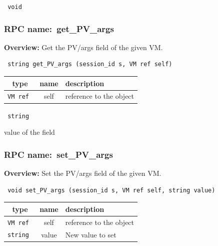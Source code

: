 \vspace{0.3cm}

{\tt 
void
}



\vspace{0.3cm}
\vspace{0.3cm}
\vspace{0.3cm}
\subsubsection{RPC name:~get\_PV\_args}

{\bf Overview:} 
Get the PV/args field of the given VM.

\begin{verbatim} string get_PV_args (session_id s, VM ref self)\end{verbatim}



 
\vspace{0.3cm}
\begin{tabular}{|c|c|p{7cm}|}
 \hline
{\bf type} & {\bf name} & {\bf description} \\ \hline
{\tt VM ref } & self & reference to the object \\ \hline 

\end{tabular}

\vspace{0.3cm}

{\tt 
string
}


value of the field
\vspace{0.3cm}
\vspace{0.3cm}
\vspace{0.3cm}
\subsubsection{RPC name:~set\_PV\_args}

{\bf Overview:} 
Set the PV/args field of the given VM.

\begin{verbatim} void set_PV_args (session_id s, VM ref self, string value)\end{verbatim}



 
\vspace{0.3cm}
\begin{tabular}{|c|c|p{7cm}|}
 \hline
{\bf type} & {\bf name} & {\bf description} \\ \hline
{\tt VM ref } & self & reference to the object \\ \hline 

{\tt string } & value & New value to set \\ \hline 

\end{tabular}

